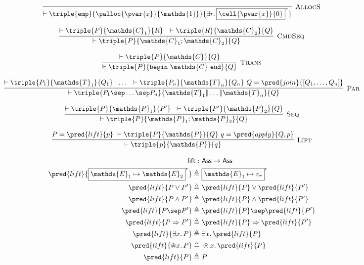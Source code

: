 \[
\infer[\textsc{AllocS}]
{
	\vdash \triple
	{\mathtt{emp}}
	{\palloc{\pvar{x}}{\mathds{1}}}
	{\exists r \ldotp \boxed{\cell{\pvar{x}}{0}}^r}
}
{}
\]

\[
\infer[\textsc{CmdSeq}]
{
	\vdash \triple
	{P}
	{\mathds{C}_1; \mathds{C}_2}
	{Q}
}
{
	\vdash \triple
	{P}
	{\mathds{C}_1}
	{R}\ \
	\vdash \triple
	{R}
	{\mathds{C}_2}
	{Q}
}
\]

\[
\infer[\textsc{Trans}]
{
	\vdash \triple
	{P}
	{\mathtt{begin}\ \mathds{C}\ \mathtt{end}}
	{Q}
}
{
	\vdash \triple
	{P}
	{\mathds{C}}
	{Q}
}
\]

\[
\infer[\textsc{Par}]
{
	\vdash \triple
	{P_1 \sep \ldots \sep P_n}
	{\mathds{T}_1 \| \ldots \| \mathds{T}_n}
	{Q}
}
{
	\vdash \triple
	{P_1}
	{\mathds{T}_1}
	{Q_1}\ \
	\ldots\ \
	\vdash \triple
	{P_n}
	{\mathds{T}_n}
	{Q_n}\
	Q = \pred{join}{[Q_1, \ldots, Q_n]}
}
\]

\[
\infer[\textsc{Seq}]
{
	\vdash \triple
	{P}
	{\mathds{P}_1; \mathds{P}_2}
	{Q}
}
{
	\vdash \triple
	{P}
	{\mathds{P}_1}
	{P'}\ \
	\vdash \triple
	{P'}
	{\mathds{P}_2}
	{Q}
}
\]

\[
\infer[\textsc{Lift}]
{
	\vdash \triple
	{p}
	{\mathds{P}}
	{q}
}
{
	P = \pred{lift}{p}\
	\vdash \triple
	{P}
	{\mathds{P}}
	{Q}\
	q = \pred{apply}{Q, p}
}
\]

\begin{align*}
\mathsf{lift} :&\ \mathsf{Ass} \rightarrow \mathsf{Ass} \\
\pred{lift}{\boxed{\mathds{E}_1 \mapsto \mathds{E}_2}^r} \triangleq&\ \boxed{\mathds{E}_1 \mapsto v_r}^r \\
\pred{lift}{P \lor P'} \triangleq&\ \pred{lift}{P} \lor \pred{lift}{P'} \\
\pred{lift}{P \land P'} \triangleq&\ \pred{lift}{P} \land \pred{lift}{P'} \\
\pred{lift}{P \sep P'} \triangleq&\ \pred{lift}{P} \sep \pred{lift}{P'} \\
\pred{lift}{P \Rightarrow P'} \triangleq&\ \pred{lift}{P} \Rightarrow \pred{lift}{P'} \\
\pred{lift}{\exists x \ldotp P} \triangleq&\ \exists x \ldotp \pred{lift}{P} \\
\pred{lift}{\circledast x \ldotp P} \triangleq&\ \circledast x \ldotp \pred{lift}{P} \\
\pred{lift}{P} \triangleq&\ P
\end{align*}

